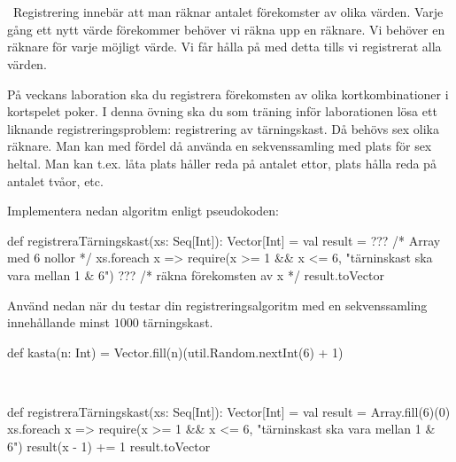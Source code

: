 \QUESTEND


\QUESTBEGIN

\Task \what~\TODO



\SOLUTION

\TaskSolved \what~\TODO

\QUESTEND






\QUESTBEGIN

\Task \what~Registrering innebär att man räknar antalet förekomster av olika värden. Varje gång ett nytt värde förekommer behöver vi räkna upp en räknare. Vi behöver en räknare för varje möjligt värde. Vi får hålla på med detta tills vi registrerat alla värden.

På veckans laboration ska du registrera förekomsten av olika kortkombinationer i kortspelet poker. I denna övning ska du som träning inför laborationen lösa ett liknande registreringsproblem:  registrering av tärningskast. Då behövs sex olika räknare. Man kan med fördel då använda en sekvenssamling med plats för sex heltal. Man kan t.ex. låta  plats  håller reda på antalet ettor, plats  hålla reda på antalet tvåor, etc.

\Subtask Implementera nedan algoritm enligt pseudokoden:
\begin{Code}
def registreraTärningskast(xs: Seq[Int]): Vector[Int] = {
  val result = ??? /* Array med 6 nollor */
  xs.foreach{ x =>
    require(x >= 1 && x <= 6, "tärninskast ska vara mellan 1 & 6")
    ??? /* räkna förekomsten av x */
  }
  result.toVector
}
\end{Code}

\Subtask Använd  nedan när du testar din registreringsalgoritm med en sekvenssamling innehållande minst $1000$ tärningskast.
\begin{Code}
def kasta(n: Int) = Vector.fill(n)(util.Random.nextInt(6) + 1)
\end{Code}

\SOLUTION

\TaskSolved \what~

\SubtaskSolved
\begin{Code}
def registreraTärningskast(xs: Seq[Int]): Vector[Int] = {
  val result = Array.fill(6)(0)
  xs.foreach{ x =>
    require(x >= 1 && x <= 6, "tärninskast ska vara mellan 1 & 6")
    result(x - 1) += 1
  }
  result.toVector
}
\end{Code}

